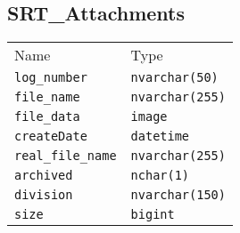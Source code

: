 \subsection{SRT\_Attachments}
\begin{table}[h]
\centering
\begin{tabular}{ll}
Name    & Type  \\
\verb|log_number|   &   \verb|nvarchar(50)|     \\
\verb|file_name|    &   \verb|nvarchar(255)|    \\
\verb|file_data|    &   \verb|image|            \\
\verb|createDate|   &   \verb|datetime|         \\
\verb|real_file_name|   &   \verb|nvarchar(255)|\\
\verb|archived|     &   \verb|nchar(1)|         \\
\verb|division|     &   \verb|nvarchar(150)|    \\
\verb|size|         &   \verb|bigint|
\end{tabular}
\end{table}
